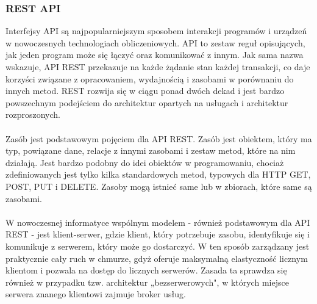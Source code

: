 \documentclass[12pt,a4paper]{article}
\begin{document}
\newpage
\subsubsection{REST API}

Interfejsy API są najpopularniejszym sposobem interakcji programów i urządzeń w nowoczesnych technologiach obliczeniowych. API to zestaw reguł opisujących, jak jeden program może się łączyć oraz komunikować z innym. Jak sama nazwa wskazuje, API REST przekazuje na każde żądanie stan każdej transakcji, co daje korzyści związane z opracowaniem, wydajnością i zasobami w porównaniu do innych metod. REST rozwija się w ciągu ponad dwóch dekad i jest bardzo powszechnym podejściem do architektur opartych na usługach i architektur rozproszonych.
\\\\
Zasób jest podstawowym pojęciem dla API REST. Zasób jest obiektem, który ma typ, powiązane dane, relacje z innymi zasobami i zestaw metod, które na nim działają. Jest bardzo podobny do idei obiektów w programowaniu, chociaż zdefiniowanych jest tylko kilka standardowych metod, typowych dla HTTP GET, POST, PUT i DELETE. Zasoby mogą istnieć same lub w zbiorach, które same są zasobami.
\\\\
W nowoczesnej informatyce wspólnym modelem - również podstawowym dla API REST - jest klient-serwer, gdzie klient, który potrzebuje zasobu, identyfikuje się i komunikuje z serwerem, który może go dostarczyć. W ten sposób zarządzany jest praktycznie cały ruch w chmurze, gdyż oferuje maksymalną elastyczność licznym klientom i pozwala na dostęp do licznych serwerów. Zasada ta sprawdza się również w przypadku tzw. architektur „bezserwerowych", w których miejsce serwera znanego klientowi zajmuje broker usług.

\newpage
\end{document}
